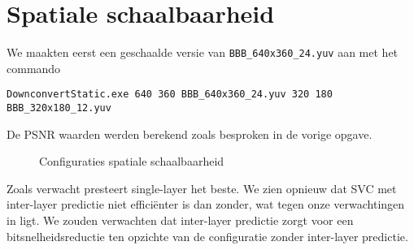 \documentclass[12pt,a4paper,oneside]{article}
\begin{document}
\section{Spatiale schaalbaarheid}
We maakten eerst een geschaalde versie van \verb$BBB_640x360_24.yuv$ aan met het commando
\begin{verbatim}
DownconvertStatic.exe 640 360 BBB_640x360_24.yuv 320 180 BBB_320x180_12.yuv
\end{verbatim}
De PSNR waarden werden berekend zoals besproken in de vorige opgave.
\begin{figure}[H]
  \begin{center}
    
    \caption{Configuraties spatiale schaalbaarheid}
    \label{graph:graph1}
  \end{center}
\end{figure}
\noindent Zoals verwacht presteert single-layer het beste. We zien opnieuw dat SVC met inter-layer predictie niet effici\"enter is dan zonder, wat tegen onze verwachtingen in ligt. We zouden verwachten dat inter-layer predictie zorgt voor een bitsnelheidsreductie ten opzichte van de configuratie zonder inter-layer predictie.
\end{document}
